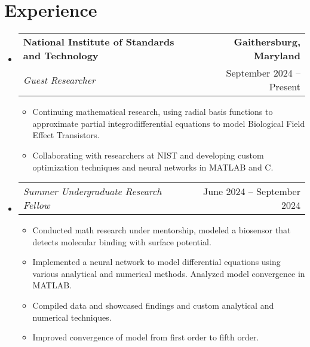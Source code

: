 \documentclass[11pt]{article}
\makeatletter
\newcommand{\resumeItem}[1]{
  \item\small{
    {#1 \vspace{-2pt}}
  }
}
\newcommand{\resumeSubheading}[4]{
  \vspace{-2pt}\item
    \begin{tabular*}{1.0\textwidth}[t]{l@{\extracolsep{\fill}}r}
      \textbf{#1} & \textbf{\small #2} \\
      \textit{\small#3} & {\small #4} \\
    \end{tabular*}\vspace{-7pt}
}
\newcommand{\resumeSubSubheading}[2]{
 \vspace{-2pt}
    \item
    \begin{tabular*}{1.0\textwidth}{l@{\extracolsep{\fill}}r}
    \textit{\small#1} & {\small #2} \\
    \end{tabular*}\vspace{-7pt}
}
\newcommand{\resumeSubHeadingListStart}{\begin{itemize}[leftmargin=0.0in, label={}]}
\newcommand{\resumeSubHeadingListEnd}{\end{itemize}}
\newcommand{\resumeItemListStart}{\begin{itemize}}
\newcommand{\resumeItemListEnd}{\end{itemize}\vspace{-5pt}}
\makeatother
\begin{document}
\section{Experience}
  \resumeSubHeadingListStart
      \resumeSubheading
      {National Institute of Standards and Technology}{Gaithersburg, Maryland}
      {Guest Researcher}{September 2024 -- Present}
      \resumeItemListStart
        \resumeItem {Continuing mathematical research, using radial basis functions to approximate partial integrodifferential equations to model Biological Field Effect Transistors.}
        \resumeItem {Collaborating with researchers at NIST and developing custom optimization techniques and neural networks in MATLAB and C.}
        \resumeItemListEnd
    \resumeSubSubheading
    {Summer Undergraduate Research Fellow}{June 2024 -- September 2024}
          \resumeItemListStart
                \resumeItem {Conducted math research under mentorship, modeled a biosensor that detects molecular binding with surface potential.}
                \resumeItem{Implemented a neural network to model differential equations using various analytical and numerical methods. Analyzed model convergence in MATLAB.}
                \resumeItem {Compiled data and showcased findings and custom analytical and numerical techniques.}
                \resumeItem {Improved convergence of model from first order to fifth order.}
        \resumeItemListEnd
  \resumeSubHeadingListEnd

\end{document}
